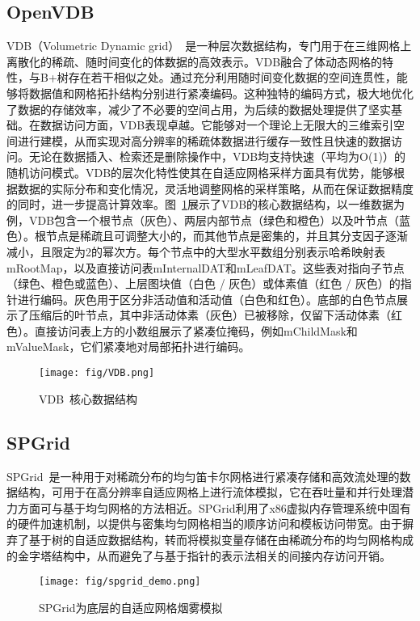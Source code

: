 \subsection{OpenVDB}
VDB（Volumetric Dynamic grid）~\cite{openvdb}是一种层次数据结构，专门用于在三维网格上离散化的稀疏、随时间变化的体数据的高效表示。VDB融合了体动态网格的特性，与B+树存在若干相似之处。通过充分利用随时间变化数据的空间连贯性，能够将数据值和网格拓扑结构分别进行紧凑编码。这种独特的编码方式，极大地优化了数据的存储效率，减少了不必要的空间占用，为后续的数据处理提供了坚实基础。在数据访问方面，VDB表现卓越。它能够对一个理论上无限大的三维索引空间进行建模，从而实现对高分辨率的稀疏体数据进行缓存一致性且快速的数据访问。无论在数据插入、检索还是删除操作中，VDB均支持快速（平均为O(1)）的随机访问模式。VDB的层次化特性使其在自适应网格采样方面具有优势，能够根据数据的实际分布和变化情况，灵活地调整网格的采样策略，从而在保证数据精度的同时，进一步提高计算效率。图~\ref{fig:vdb}展示了VDB的核心数据结构，以一维数据为例，VDB包含一个根节点（灰色）、两层内部节点（绿色和橙色）以及叶节点（蓝色）。根节点是稀疏且可调整大小的，而其他节点是密集的，并且其分支因子逐渐减小，且限定为2的幂次方。每个节点中的大型水平数组分别表示哈希映射表mRootMap，以及直接访问表mInternalDAT和mLeafDAT。这些表对指向子节点（绿色、橙色或蓝色）、上层图块值（白色 / 灰色）或体素值（红色 / 灰色）的指针进行编码。灰色用于区分非活动值和活动值（白色和红色）。底部的白色节点展示了压缩后的叶节点，其中非活动体素（灰色）已被移除，仅留下活动体素（红色）。直接访问表上方的小数组展示了紧凑位掩码，例如mChildMask和mValueMask，它们紧凑地对局部拓扑进行编码。
\begin{figure}[H]
    \centering
    \texttt{[image: fig/VDB.png]}
    \caption{VDB~\cite{openvdb}核心数据结构}
    \label{fig:vdb}
\end{figure}

\subsection{SPGrid}
SPGrid~\cite{setaluri2014spgrid}是一种用于对稀疏分布的均匀笛卡尔网格进行紧凑存储和高效流处理的数据结构，可用于在高分辨率自适应网格上进行流体模拟，它在吞吐量和并行处理潜力方面可与基于均匀网格的方法相近。SPGrid利用了x86虚拟内存管理系统中固有的硬件加速机制，以提供与密集均匀网格相当的顺序访问和模板访问带宽。由于摒弃了基于树的自适应数据结构，转而将模拟变量存储在由稀疏分布的均匀网格构成的金字塔结构中，从而避免了与基于指针的表示法相关的间接内存访问开销。
\begin{figure}[H]
    \centering
    \texttt{[image: fig/spgrid\_demo.png]}
    \caption{SPGrid为底层的自适应网格烟雾模拟}
    \label{fig:sparse}
\end{figure}


